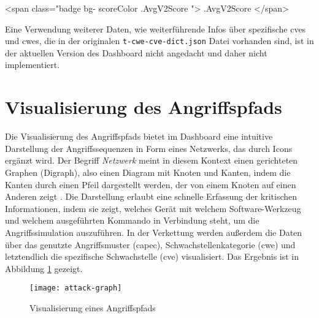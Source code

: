 \begin{code}[caption=Aufbau eines \gls{html} Elements zur Darstellung eines CVSS Werts in einer Bootstrap Komponente]
    <span class="badge bg-{{ scoreColor .AvgV2Score }}">{{ .AvgV2Score }}</span>
\end{code}
\label{listing:template-cvss}

Eine Verwendung weiterer Daten, wie weiterführende Infos über spezifische \glspl{cve} und \glspl{cwe}, die in der originalen \verb|t-cwe-cve-dict.json| Datei vorhanden sind, ist in der aktuellen Version des Dashboard nicht angedacht und daher nicht implementiert. 


\section{Visualisierung des Angriffspfads}
\label{sec:impl-visualisierungDesAngriffspfads}
Die Visualisierung des Angriffspfads bietet im Dashboard eine intuitive Darstellung der Angriffssequenzen in Form eines Netzwerks, das durch Icons ergänzt wird. Der Begriff \textit{Netzwerk} meint in diesem Kontext einen gerichteten Graphen (Digraph), also einen Diagram mit Knoten und Kanten, indem die Kanten durch einen Pfeil dargestellt werden, der von einem Knoten auf einen Anderen zeigt \autocite{DigraphDefinition}. Die Darstellung erlaubt eine schnelle Erfassung der kritischen Informationen, indem sie zeigt, welches Gerät mit welchem Software-Werkzeug und welchem ausgeführten Kommando in Verbindung steht, um die Angriffssimulation auszuführen. In der Verkettung werden außerdem die Daten über das genutzte Angriffsmuster (\gls{capec}), Schwachstellenkategorie (\gls{cwe}) und letztendlich die spezifische Schwachstelle (\gls{cve}) visualisiert. Das Ergebnis ist in Abbildung \ref{fig:attack-graph} gezeigt.
\begin{figure}
    \centering
    \texttt{[image: attack-graph]}
    \caption{Visualisierung eines Angriffspfads}
    \label{fig:attack-graph}
\end{figure}

